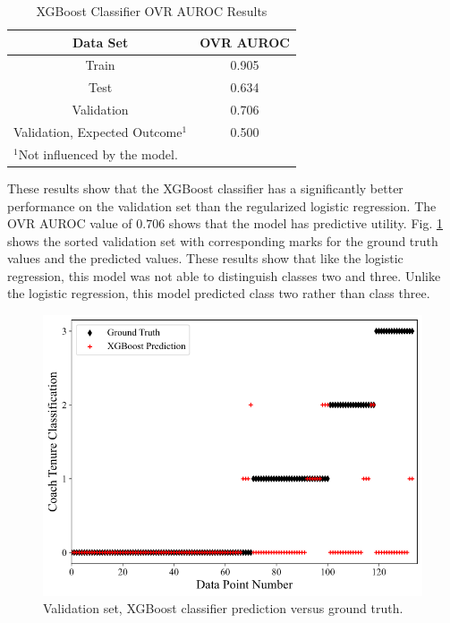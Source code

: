 \documentclass[conference]{IEEEtran}
\begin{document}
\begin{table}[htbp]
\caption{XGBoost Classifier OVR AUROC Results}
\begin{center}
\begin{tabular}{|c||c|}
\hline
\textbf{Data Set} & \textbf{OVR AUROC} \\
\hline
\hline
Train & 0.905 \\
\hline
Test & 0.634 \\
\hline
Validation & 0.706 \\
\hline
Validation, Expected Outcome$^{\mathrm{1}}$ & 0.500 \\
\hline
\multicolumn{2}{l}{$^{\mathrm{1}}$Not influenced by the model.}
\end{tabular}
\label{tab12}
\end{center}
\end{table}

These results show that the XGBoost classifier has a significantly better performance on the validation set than the regularized logistic regression. The OVR AUROC value of $0.706$ shows that the model has predictive utility. Fig. \ref{fig12} shows the sorted validation set with corresponding marks for the ground truth values and the predicted values. These results show that like the logistic regression, this model was not able to distinguish classes two and three. Unlike the logistic regression, this model predicted class two rather than class three. 

\begin{figure}[htbp]
\centerline{\includegraphics[width=1\linewidth]{test5.png}}
\caption{Validation set, XGBoost classifier prediction versus ground truth.}
\label{fig12}
\end{figure}
\end{document}
